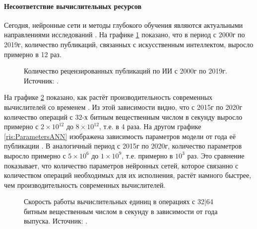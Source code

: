 \paragraph{Несоответствие вычислительных ресурсов}
Сегодня, нейронные сети и методы глубокого обучения являются актуальными направлениями исследований \cite{zhang2021ai}. На графике \ref{ris:PublicationsAI} показано, что в период с 2000г по 2019г, количество публикаций, связанных с искусственным интеллектом, выросло примерно в 12 раз.
\begin{figure}[h!]
	\caption{Количество рецензированных публикаций по ИИ с 2000г по 2019г. Источник: \cite{zhang2021ai}.}
	\label{ris:PublicationsAI}
\end{figure}
На графике \ref{ris:PerfomanceGPUCPU} показано, как растёт производительность современных вычислителей со временем \cite{sun2019summarizing}. Из этой зависимости видно, что с 2015г по 2020г количество операций с $32$-х битным вещественным числом в секунду выросло примерно с $2\times10^{12}$ до $8\times10^{12}$, т.е. в 4 раза. На другом графике \ref{ris:ParametersANN} изображена зависимость параметров модели от года её публикации \cite{bernstein2021freely}. В аналогичный период с 2015г по 2020г, количество параметров выросло примерно с $5\times10^{6}$ до $1\times10^{9}$, т.е. примерно в $10^{3}$ раз. Это сравнение показывает, что количество параметров нейронных сетей, которое связанно с количеством операций необходимых для их исполнения, растёт намного быстрее, чем производительность современных вычислителей.
\begin{figure}[htbp]
	\caption{Скорость работы вычислительных единиц в операциях с 32|64 битным вещественным числом в секунду в зависимости от года выпуска. Источник: \cite{sun2019summarizing}.}
	\label{ris:PerfomanceGPUCPU}
\end{figure}
